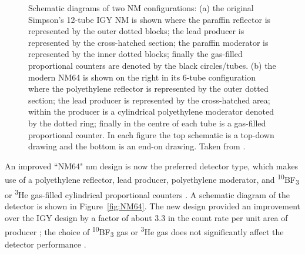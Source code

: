 \begin{figure}[ht!]
	\centering
	\qquad
	\caption{Schematic diagrams of two NM configurations: (a) the original Simpson's 12-tube IGY NM is shown where the paraffin reflector is represented by the outer dotted blocks; the lead producer is represented by the cross-hatched section; the paraffin moderator is represented by the inner dotted blocks; finally the gas-filled proportional counters are denoted by the black circles/tubes. (b) the modern NM64 is shown on the right in its 6-tube configuration where the polyethylene reflector is represented by the outer dotted section; the lead producer is represented by the cross-hatched area; within the producer is a cylindrical polyethylene moderator denoted by the dotted ring; finally in the centre of each tube is a gas-filled proportional counter. In each figure the top schematic is a top-down drawing and the bottom is an end-on drawing. Taken from \citet{kang_characteristics_2012}.}
	\label{fig:NM}
\end{figure}

An improved ``NM64" \gls{nm} design is now the preferred detector type, which makes use of a polyethylene reflector, lead producer, polyethylene moderator, and \textsuperscript{10}BF\textsubscript{3} or \textsuperscript{3}He gas-filled cylindrical proportional counters \citep{kang_characteristics_2012}. A schematic diagram of the detector is shown in Figure~\ref{fig:NM64}. The new design provided an improvement over the IGY design by a factor of about 3.3 in the count rate per unit area of producer \citep{stoker_neutron_2000}; the choice of \textsuperscript{10}BF\textsubscript{3} gas or \textsuperscript{3}He gas does not significantly affect the detector performance \citep{kang_characteristics_2012}.



